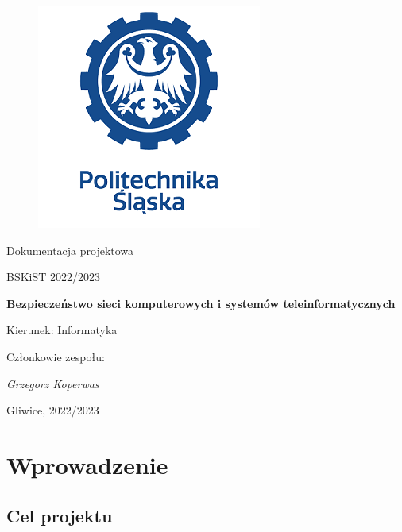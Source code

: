 \documentclass[12pt,a4paper]{article}
\begin{document}
\nocite{*}

\clearpage
\begin{figure}[h]
\centering
\includegraphics{media/ps-logo.png}
\end{figure}
\hspace{3cm}
\begin{center}Dokumentacja projektowa\end{center}
\begin{center}BSKiST 2022/2023\end{center}
\hspace{3cm}
\begin{center}\large\textbf{Bezpieczeństwo sieci komputerowych i systemów teleinformatycznych}\end{center}
\hspace{7cm}
\begin{flushright}Kierunek: Informatyka
\end{flushright}
\begin{flushright}Członkowie zespołu:
\par
\textit{Grzegorz Koperwas}
\end{flushright}
\vfill
\begin{center}Gliwice, 2022/2023\end{center}

\newpage
{}
\tableofcontents

\newpage
\section{Wprowadzenie}


\subsection{Cel projektu}
\end{document}

